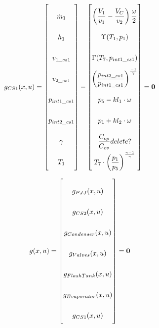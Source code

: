 \begin{equation} \label{eq:consump_x}\renewcommand{\arraystretch}{2.5}
	g_{CS1}(x,u) =  \begin{bmatrix}
		\dot{m}_1  		 	\\ %
		h_{1}				\\ %
		v_{1\_cs1}			\\ %
		v_{2\_cs1}			\\ %
		p_{int1\_cs1}		\\ %
		p_{int2\_cs1}		\\ %
		\gamma				\\ %
		T_{1}				\\ %
	\end{bmatrix}
	-
	\begin{bmatrix}
		\left(\dfrac{V_1}{v_1} - \dfrac{V_C}{v_2}\right) \dfrac{\omega}{2} \\			%
		\Upsilon(T_{1}, p_{1})		\\													%
		\Gamma(T_{7},p_{int1\_cs1}) \\													%
		\left(\dfrac{p_{int2\_cs1}}{p_{int1\_cs1}}\right)^{\frac{-1}{\gamma}} \\		%
		p_{5} - kl_1 \cdot \omega \\													%
		p_{1} + kl_2 \cdot \omega \\													%
		\dfrac{C_{cp}}{C_{cv}} delete? \\												%
		T_{7}\cdot \left(\dfrac{p_{1}}{p_{5}}\right)^{\frac{\gamma-1}{\gamma}}	\\		%
	\end{bmatrix}
	=\textbf{0}
\end{equation}


\begin{equation} \label{eq:consump_x}\renewcommand{\arraystretch}{2.5}
	g(x,u) =  \begin{bmatrix}
		g_{PJJ}(x,u)  		 	\\ %
		g_{CS2}(x,u)				\\ %
		g_{Condenser}(x,u)			\\ %
		g_{Valves}(x,u)			\\ %
		g_{FlashTank}(x,u)		\\ %
		g_{Evaporator}(x,u)		\\ %
		g_{CS1}(x,u)			\\
	\end{bmatrix}
	= \textbf{0}
\end{equation}





